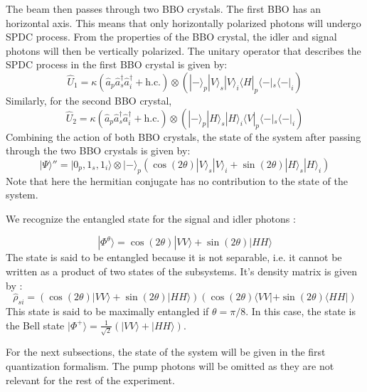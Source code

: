 \documentclass[a4paper, 12pt,oneside]{article}
\begin{document}
The beam then passes through two BBO crystals. The first BBO has an horizontal axis. This means that only horizontally polarized photons will undergo SPDC process. From the properties of the BBO crystal, the idler and signal photons will then be vertically polarized. The unitary operator that describes the SPDC process in the first BBO crystal is given by:
\begin{equation}
    \hat{U}_1 = \kappa (\hat{a}_p \hat{a}_s^\dagger \hat{a}_i^\dagger + \text{h.c.}) \otimes (|-\rangle_p|V\rangle_s|V\rangle_i \langle H|_p\langle-|_s\langle-|_i)
\end{equation}
Similarly, for the second BBO crystal, 
\begin{equation}
    \hat{U}_2 = \kappa (\hat{a}_p \hat{a}_s^\dagger \hat{a}_i^\dagger + \text{h.c.}) \otimes (|-\rangle_p|H\rangle_s |H\rangle_i \langle V|_p\langle-|_s\langle-|_i)
\end{equation}
Combining the action of both BBO crystals, the state of the system after passing through the two BBO crystals is given by:
\begin{equation}
    |\Psi\rangle'' = |0_p,1_s,1_i\rangle \otimes |-\rangle_p (\cos(2\theta)|V\rangle_s |V\rangle_i + \sin(2\theta)|H\rangle_s |H\rangle_i)
\end{equation}
Note that here the hermitian conjugate has no contribution to the state of the system. 

We recognize the entangled state for the signal and idler photons : 

\begin{equation}
    |\Phi^\theta\rangle = \cos(2\theta)|VV\rangle+ \sin(2\theta)|HH\rangle
\end{equation}
The state is said to be entangled because it is not separable, i.e. it cannot be written as a product of two states of the subsystems. It's density matrix is given by :
\begin{equation}
    \hat{\rho}_{si} = (\cos(2\theta)|VV\rangle+ \sin(2\theta)|HH\rangle)(\cos(2\theta)\langle VV|+ \sin(2\theta)\langle HH|)
\end{equation}
This state is said to be maximally entangled if $\theta = \pi/8$. In this case, the state is the Bell state $|\Phi^+\rangle = \frac{1}{\sqrt{2}}(|VV\rangle + |HH\rangle)$.

For the next subsections, the state of the system will be given in the first quantization formalism. The pump photons will be omitted as they are not relevant for the rest of the experiment. 
\end{document}

